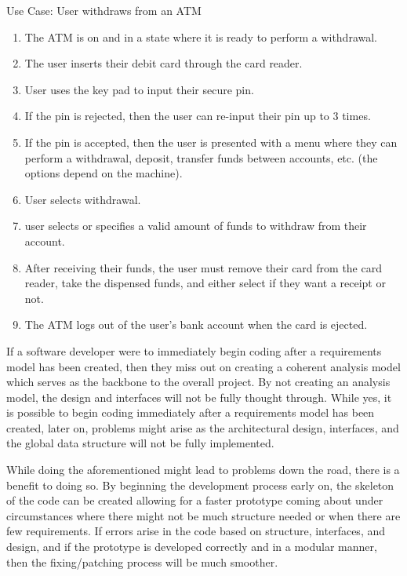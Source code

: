 	Use Case: User withdraws from an ATM
	\begin{enumerate}
		\item The ATM is on and in a state where it is ready to perform a withdrawal.
		\item The user inserts their debit card through the card reader.
		\item User uses the key pad to input their secure pin.
		\item If the pin is rejected, then the user can re-input their pin up to 3 times.
		\item If the pin is accepted, then the user is presented with a menu where they can perform a withdrawal, deposit, transfer funds between accounts, etc. (the options depend on the machine).
		\item User selects withdrawal.
		\item user selects or specifies a valid amount of funds to withdraw from their account.
		\item After receiving their funds, the user must remove their card from the card reader, take the dispensed funds, and either select if they want a receipt or not.
		\item The ATM logs out of the user's bank account when the card is ejected.
	\end{enumerate}

	If a software developer were to immediately begin coding after a requirements model has been created, then they miss out on creating a coherent analysis model which serves as the backbone to the overall project. By not creating an analysis model, the design and interfaces will not be fully thought through. While yes, it is possible to begin coding immediately after a requirements model has been created, later on, problems might arise as the architectural design, interfaces, and the global data structure will not be fully implemented.

	While doing the aforementioned might lead to problems down the road, there is a benefit to doing so. By beginning the development process early on, the skeleton of the code can be created allowing for a faster prototype coming about under circumstances where there might not be much structure needed or when there are few requirements. If errors arise in the code based on structure, interfaces, and design, and if the prototype is developed correctly and in a modular manner, then the fixing/patching process will be much smoother. 


